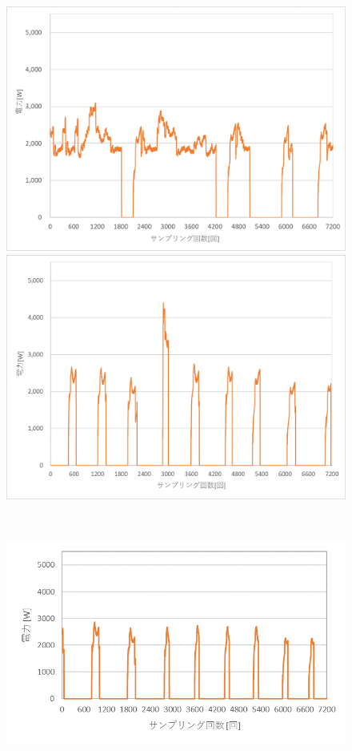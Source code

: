 \documentclass[a4j,fleqn,dvipdfmx,uplatex]{jsarticle}
\begin{document}
\begin{figure}[htb]
\begin{minipage}[b]{0.45\linewidth}
      \includegraphics[width=\linewidth]{img/0719_power.png}
    \end{minipage}
    \begin{minipage}[b]{0.45\linewidth}
      \centering
      \includegraphics[width=\linewidth]{img/0721_power.png}
    \end{minipage}\\
    \begin{minipage}[b]{0.45\linewidth}
      \centering
      \includegraphics[width=\linewidth]{img/0723_power.png}

\end{minipage}
\end{figure}
\end{document}
